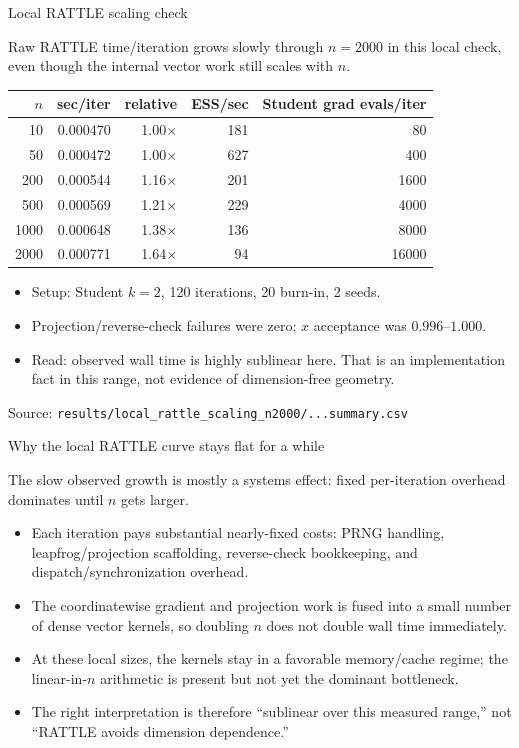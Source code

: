 \documentclass[11pt,aspectratio=169]{beamer}
\newcommand{\claim}[1]{\begin{block}{}\large #1\end{block}}
\newcommand{\figsource}[1]{{\scriptsize\color{gray}Source: #1}}
\begin{document}
\begin{frame}{Local RATTLE scaling check}
  \claim{Raw RATTLE time/iteration grows slowly through $n=2000$ in this local check, even though the internal vector work still scales with $n$.}
  \vspace{-0.2cm}
  \begin{center}
    \scriptsize
    \begin{tabular}{rrrrr}
      \toprule
      $n$ & sec/iter & relative & ESS/sec & Student grad evals/iter \\
      \midrule
        10 & 0.000470 & 1.00$\times$ & 181 & 80 \\
        50 & 0.000472 & 1.00$\times$ & 627 & 400 \\
       200 & 0.000544 & 1.16$\times$ & 201 & 1600 \\
       500 & 0.000569 & 1.21$\times$ & 229 & 4000 \\
      1000 & 0.000648 & 1.38$\times$ & 136 & 8000 \\
      2000 & 0.000771 & 1.64$\times$ & 94 & 16000 \\
      \bottomrule
    \end{tabular}
  \end{center}
  \vspace{-0.2cm}
  \small
  \begin{itemize}
    \item Setup: Student $k=2$, 120 iterations, 20 burn-in, 2 seeds.
    \item Projection/reverse-check failures were zero; $x$ acceptance was $0.996$--$1.000$.
    \item Read: observed wall time is highly sublinear here. That is an implementation fact in this range, not evidence of dimension-free geometry.
  \end{itemize}
  \figsource{\texttt{results/local\_rattle\_scaling\_n2000/...summary.csv}}
\end{frame}

\begin{frame}{Why the local RATTLE curve stays flat for a while}
  \claim{The slow observed growth is mostly a systems effect: fixed per-iteration overhead dominates until $n$ gets larger.}
  \begin{itemize}
    \item Each iteration pays substantial nearly-fixed costs: PRNG handling, leapfrog/projection scaffolding, reverse-check bookkeeping, and dispatch/synchronization overhead.
    \item The coordinatewise gradient and projection work is fused into a small number of dense vector kernels, so doubling $n$ does not double wall time immediately.
    \item At these local sizes, the kernels stay in a favorable memory/cache regime; the linear-in-$n$ arithmetic is present but not yet the dominant bottleneck.
    \item The right interpretation is therefore ``sublinear over this measured range,'' not ``RATTLE avoids dimension dependence.''
  \end{itemize}
\end{frame}
\end{document}
